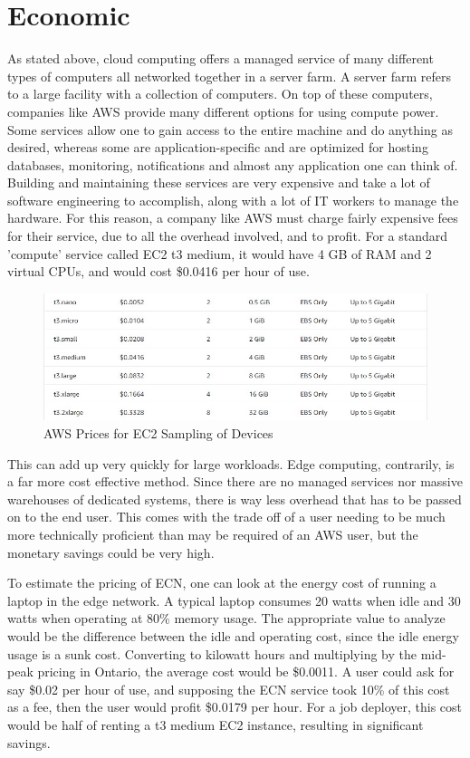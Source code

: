 \documentclass[../mthe-493-final-project.tex]{subfiles}
\begin{document}
    \section{Economic}
    \label{sec:economic}
     As stated above, cloud computing offers a managed service of many different types of computers all networked together in a server farm. A server farm refers to a large facility with a collection of computers. On top of these computers, companies like AWS provide many different options for using compute power. Some services allow one to gain access to the entire machine and do anything as desired, whereas some are application-specific and are optimized for hosting databases, monitoring, notifications and almost any application one can think of. Building and maintaining these services are very expensive and take a lot of software engineering to accomplish, along with a lot of IT workers to manage the hardware. For this reason, a company like AWS must charge fairly expensive fees for their service, due to all the overhead involved, and to profit. For a standard 'compute' service called EC2 t3 medium, it would have 4 GB of RAM and 2 virtual CPUs, and would cost \$0.0416 per hour of use. 
     \begin{figure}
        \centering
        \includegraphics{thesis/img/aws_ec2_pricing.jpg}
        \caption{AWS Prices for EC2 Sampling of Devices}
        \label{fig:ec2-pricing}
    \end{figure}
     This can add up very quickly for large workloads. Edge computing, contrarily, is a far more cost effective method. Since there are no managed services nor massive warehouses of dedicated systems, there is way less overhead that has to be passed on to the end user. This comes with the trade off of a user needing to be much more technically proficient than may be required of an AWS user, but the monetary savings could be very high. 
     
     To estimate the pricing of ECN, one can look at the energy cost of running a laptop in the edge network. A typical laptop consumes 20 watts when idle and 30 watts when operating at 80\% memory usage. The appropriate value to analyze would be the difference between the idle and operating cost, since the idle energy usage is a sunk cost. Converting to kilowatt hours and multiplying by the mid-peak pricing in Ontario, the average cost would be \$0.0011. A user could ask for say \$0.02 per hour of use, and supposing the ECN service took 10\% of this cost as a fee, then the user would profit \$0.0179 per hour. For a job deployer, this cost would be half of renting a t3 medium EC2 instance, resulting in significant savings. 
    
\end{document}
